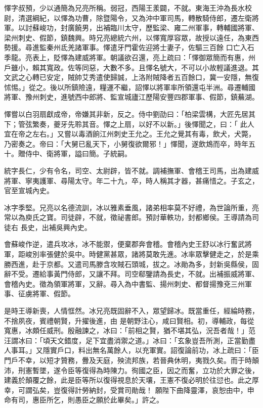 \begin{pinyinscope}
 懌字叔預，少以通簡為兄亮所稱。弱冠，西陽王羕闢，不就。東海王沖為長水校尉，清選綱紀，以懌為功曹，除暨陽令，又為沖中軍司馬，轉散騎侍郎，遷左衛將軍。以討蘇峻功，封廣饒男，出補臨川太守，歷監梁、雍二州軍事，轉輔國將軍、梁州刺史、假節，鎮魏興。時兄亮總統六州，以懌寬厚容眾，故授以遠任，為東西勢援。尋進監秦州氐羌諸軍事。懌遣牙門霍佐迎將士妻子，佐驅三百餘
 口亡入石季龍。亮表上，貶懌為建威將軍。朝議欲召還，亮上疏曰：「懌御眾簡而有惠，州戶雖小，賴其寬政。佐等同惡，大數不多。且懌名號大，不可以小故輕議進退。其文武之心轉已安定，賊帥艾秀遣使歸誠，上洛附賊降者五百餘口，冀一安隱，無復怵惕。」從之。後以所鎮險遠，糧運不繼，詔懌以將軍率所領還屯半洲。尋遷輔國將軍、豫州刺史，進號西中郎將、監宣城廬江歷陽安豐四郡軍事、假節，鎮蕪湖。



 懌嘗以白羽扇獻成帝，帝嫌其非新，反之。侍中劉劭曰：「柏梁雲構，大匠先居其下；管弦繁奏，夔牙先聆其音。懌之上扇，以好不以新。」後懌聞之，曰：「
 此人宜在帝之左右。」又嘗以毒酒餉江州刺史王允之。王允之覺其有毒，飲犬，犬斃，乃密奏之。帝曰：「大舅已亂天下，小舅復欲爾邪！」懌聞，遂飲鴆而卒，時年五十。贈侍中、衛將軍，謚曰簡。子統嗣。



 統字長仁，少有令名，司空、太尉辟，皆不就。調補撫軍、會稽王司馬，出為建威將軍、寧夷護軍、尋陽太守。年二十九，卒，時人稱其才器，甚痛惜之。子玄之，官至宣城內史。



 冰字季堅。兄亮以名德流訓，冰以雅素垂風，諸弟相率莫不好禮，為世論所重，亮常以為庾氏之寶。司徒辟，不就，徵祕書郎。預討華軼功，封都鄉侯。王導請為司徒右
 長史，出補吳興內史。



 會蘇峻作逆，遣兵攻冰，冰不能禦，便棄郡奔會稽。會稽內史王舒以冰行奮武將軍，距峻別率張健於吳中。時健黨甚眾，諸將莫敢先進。冰率眾擊健走之，於是乘勝西進，赴于京都。又遣司馬滕含攻賊石頭城，拔之。冰勛為多，封新吳縣侯，固辭不受。遷給事黃門侍郎，又讓不拜。司空郗鑒請為長史，不就。出補振威將軍、會稽內史。徵為領軍將軍，又辭。尋入為中書監、揚州刺史、都督揚豫兗三州軍事、征虜將軍、假節。



 是時王導新喪，人情恇然。冰兄亮既固辭不入，眾望歸冰。既當重任，經綸時務，不捨夙夜，賓禮朝賢，升擢後進，由
 是朝野注心，咸曰賢相。初，導輔政，每從寬惠，冰頗任威刑。殷融諫之，冰曰：「前相之賢，猶不堪其弘，況吾者哉！」范汪謂冰曰：「頃天文錯度，足下宜盡消禦之道。」冰曰：「玄象豈吾所測，正當勤盡人事耳。」又隱實戶口，料出無名萬餘人，以充軍實。詔復論前功，冰上疏曰：「臣門戶不幸，以短才贊務，釁及天庭，殃流邦族，若晉典休明，夷戮久矣。而于時顛沛，刑憲暫墜，遂令臣等復得為時陳力。徇國之臣，因之而奮，立功於大罪之後，建義於顛覆之餘，此是臣等所以復得視息於天壤，王憲不復必明於往愆也。此之厚幸，可謂弘矣，豈復得計勞納封，受賞司勛哉！
 願陛下曲降靈澤，哀恕由中，申命有司，惠臣所乞，則愚臣之願於此畢矣。」許之。




\end{pinyinscope}
